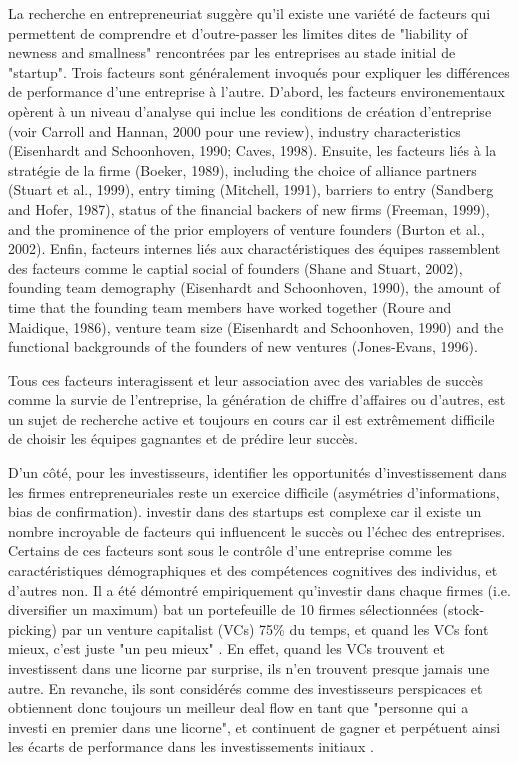 \documentclass[12pt]{article}
\begin{document}
La recherche en entrepreneuriat suggère qu'il existe une variété de facteurs qui permettent de comprendre et d'outre-passer les limites dites de "liability of newness and smallness" rencontrées par les entreprises au stade initial de "startup". Trois facteurs sont généralement invoqués pour expliquer les différences de performance d'une entreprise à l'autre. D'abord, les facteurs environementaux opèrent à un niveau d'analyse qui inclue les conditions de création d'entreprise (voir Carroll and Hannan, 2000 pour une review), industry characteristics (Eisenhardt and Schoonhoven, 1990; Caves, 1998). Ensuite, les facteurs liés à la stratégie de la firme (Boeker, 1989), including the choice of alliance partners (Stuart et al., 1999), entry timing (Mitchell, 1991), barriers to entry (Sandberg and Hofer, 1987), status of the financial backers of new firms (Freeman, 1999), and the prominence of the prior employers of venture founders (Burton et al., 2002). Enfin, facteurs internes liés aux charactéristiques des équipes rassemblent des facteurs comme le captial social of founders (Shane and Stuart, 2002), founding team demography (Eisenhardt and Schoonhoven, 1990), the amount of time that the founding team members have worked together (Roure and Maidique, 1986), venture team size (Eisenhardt and Schoonhoven, 1990) and the functional backgrounds of the founders of new ventures (Jones-Evans, 1996).

Tous ces facteurs interagissent et leur association avec des variables de succès comme la survie de l'entreprise, la génération de chiffre d'affaires ou d'autres, est un sujet de recherche active et toujours en cours car il est extrêmement difficile de choisir les équipes gagnantes et de prédire leur succès.

D'un côté, pour les investisseurs, identifier les opportunités d'investissement dans les firmes entrepreneuriales reste un exercice difficile (asymétries d'informations, bias de confirmation). investir dans des startups est complexe car il existe un nombre incroyable de facteurs qui influencent le succès ou l'échec des entreprises. Certains de ces facteurs sont sous le contrôle d'une entreprise comme les caractéristiques démographiques et des compétences cognitives des individus, et d'autres non. Il a été démontré empiriquement qu'investir dans chaque firmes (i.e. diversifier un maximum) bat un portefeuille de 10 firmes sélectionnées (stock-picking) par un venture capitalist (VCs) 75\% du temps, et quand les VCs font mieux, c'est juste "un peu mieux" \citep{othman2020angelistdata}. En effet, quand les VCs trouvent et investissent dans une licorne par surprise, ils n'en trouvent presque jamais une autre. En revanche, ils sont considérés comme des investisseurs perspicaces et obtiennent donc toujours un meilleur deal flow en tant que "personne qui a investi en premier dans une licorne", et continuent de gagner et perpétuent ainsi les écarts de performance dans les investissements initiaux \citep{nanda2020persistent}.
\end{document}
